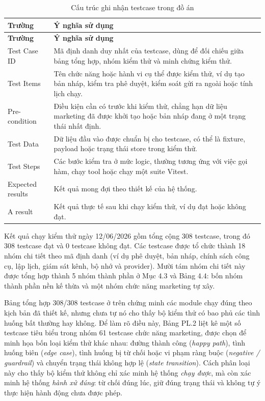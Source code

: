 \documentclass[a4paper]{article}
\renewcommand{\arraystretch}{1.25}
\begin{document}
\renewcommand{\arraystretch}{1.25}
\begin{longtable}{L{0.24\textwidth}L{0.66\textwidth}}
\caption{Cấu trúc ghi nhận testcase trong đồ án}\\
\toprule
\textbf{Trường} & \textbf{Ý nghĩa sử dụng}\\
\midrule
\endfirsthead
\toprule
\textbf{Trường} & \textbf{Ý nghĩa sử dụng}\\
\midrule
\endhead
Test Case ID & Mã định danh duy nhất của testcase, dùng để đối chiếu giữa bảng tổng hợp, nhóm kiểm thử và minh chứng kiểm thử.\\
Test Items & Tên chức năng hoặc hành vi cụ thể được kiểm thử, ví dụ tạo bản nháp, kiểm tra phê duyệt, kiểm soát gửi ra ngoài hoặc tính lịch chạy.\\
Pre-condition & Điều kiện cần có trước khi kiểm thử, chẳng hạn dữ liệu marketing đã được khởi tạo hoặc bản nháp đang ở một trạng thái nhất định.\\
Test Data & Dữ liệu đầu vào được chuẩn bị cho testcase, có thể là fixture, payload hoặc trạng thái store trong kiểm thử.\\
Test Steps & Các bước kiểm tra ở mức logic, thường tương ứng với việc gọi hàm, chạy tool hoặc chạy một suite Vitest.\\
Expected results & Kết quả mong đợi theo thiết kế của hệ thống.\\
A result & Kết quả thực tế sau khi chạy kiểm thử, ví dụ đạt hoặc không đạt.\\
\bottomrule
\end{longtable}
\renewcommand{\arraystretch}{1}

Kết quả chạy kiểm thử ngày 12/06/2026 gồm tổng cộng 308 testcase, trong đó 308 testcase đạt và 0 testcase không đạt. Các testcase được tổ chức thành 18 nhóm chi tiết theo mã định danh (ví dụ phê duyệt, bản nháp, chính sách công cụ, lập lịch, giám sát kênh, bộ nhớ và provider). Mười tám nhóm chi tiết này được tổng hợp thành 5 nhóm thành phần ở Mục 4.3 và Bảng 4.4: bốn nhóm thành phần nền kế thừa và một nhóm chức năng marketing tự xây.

Bảng tổng hợp 308/308 testcase ở trên chứng minh các module chạy đúng theo kịch bản đã thiết kế, nhưng chưa tự nó cho thấy bộ kiểm thử có bao phủ các tình huống bất thường hay không. Để làm rõ điều này, Bảng PL.2 liệt kê một số testcase tiêu biểu trong nhóm 61 testcase chức năng marketing, được chọn để minh họa bốn loại kiểm thử khác nhau: đường thành công (\textit{happy path}), tình huống biên (\textit{edge case}), tình huống bị từ chối hoặc vi phạm ràng buộc (\textit{negative / guardrail}) và chuyển trạng thái không hợp lệ (\textit{state transition}). Cách phân loại này cho thấy bộ kiểm thử không chỉ xác minh hệ thống \textit{chạy được}, mà còn xác minh hệ thống \textit{hành xử đúng}: từ chối đúng lúc, giữ đúng trạng thái và không tự ý thực hiện hành động chưa được phép.
\end{document}
